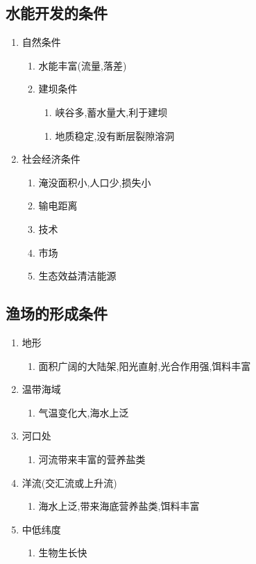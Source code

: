 \documentclass[a4paper]{article}
\begin{document}
    \subsection{水能开发的条件}
    \begin{enumerate}
        \item 自然条件
        \begin{enumerate}
            \item 水能丰富(流量,落差)
            \item 建坝条件
            \begin{enumerate}
                \item 峡谷多,蓄水量大,利于建坝
            \end{enumerate}
            \begin{enumerate}
                \item 地质稳定,没有断层裂隙溶洞
            \end{enumerate}
        \end{enumerate}
        \item 社会经济条件
        \begin{enumerate}
            \item 淹没面积小,人口少,损失小
            \item 输电距离
            \item 技术
            \item 市场
            \item 生态效益清洁能源
        \end{enumerate}
    \end{enumerate}
    \subsection{渔场的形成条件}
    \begin{enumerate}
        \item 地形
        \begin{enumerate}
            \item 面积广阔的大陆架,阳光直射,光合作用强,饵料丰富
        \end{enumerate}
        \item 温带海域
        \begin{enumerate}
            \item 气温变化大,海水上泛
        \end{enumerate}
        \item 河口处
        \begin{enumerate}
            \item 河流带来丰富的营养盐类
        \end{enumerate}
        \item 洋流(交汇流或上升流)
        \begin{enumerate}
            \item 海水上泛,带来海底营养盐类,饵料丰富
        \end{enumerate}
        \item 中低纬度
        \begin{enumerate}
            \item 生物生长快
        \end{enumerate}
    \end{enumerate}
\end{document}
